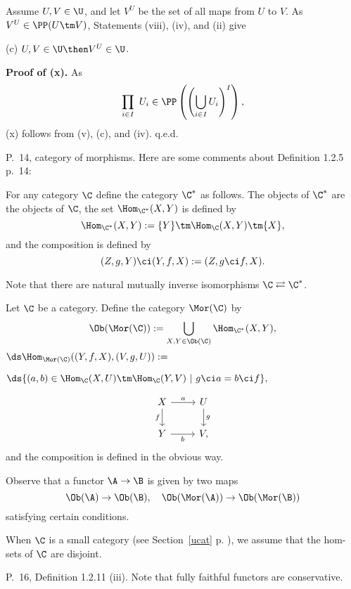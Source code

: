\documentclass[12pt]{article}
\theoremstyle{remark}
\theoremstyle{definition}
\begin{document}
Assume $U,V\in\U$, and let $V^U$ be the set of all maps from $U$ to $V$. As $V^U\in\PP(U\tm V)$, Statements (viii), (iv), and (ii) give

(c) $U,V\in\U\then V^U\in\U$.

\nn\textbf{Proof of (x).} As 
$$
\prod_{i\in I}\ U_i\in\PP\left(\left(\bigcup_{i\in I}U_i\right)^I\right),
$$
(x) follows from (v), (c), and (iv). q.e.d.



\begin{s}
P.~14, category of morphisms. Here are some comments about Definition 1.2.5 p.~14:

\begin{nota}
For any category $\C$ define the category $\C^*$\index{$\C^*$} as follows. The objects of $\C^*$ are the objects of $\C$, the set $\Hom_{\C^*}(X,Y)$ is defined by 
$$
\Hom_{\C^*}(X,Y):=\{Y\}\tm\Hom_{\C}(X,Y)\tm\{X\},
$$
and the composition is defined by 
$$
(Z,g,Y)\ci(Y,f,X):=(Z,g\ci f,X).
$$ 
\end{nota}

Note that there are natural mutually inverse isomorphisms $\C\rightleftarrows\C^*$. 

\begin{nota}
%
Let $\C$ be a category. Define the category $\Mor(\C)$ \index{$\Mor$} by 
$$
\Ob(\Mor(\C)):=\bigcup_{X,Y\in\Ob(\C)}\Hom_{\C^*}(X,Y),
$$
$\ds\Hom_{\Mor(\C)}((Y,f,X),(V,g,U)):=$\bigskip 

$\hfill\ds\{(a,b)\in\Hom_\C(X,U)\tm\Hom_\C(Y,V)\ | \ g\ci a=b\ci f\},$\bigskip

$$
\begin{tikzcd}
X\ar{d}[swap]{f}\ar{r}{a}&U\ar{d}{g}\\ 
Y\ar{r}[swap]{b}&V,
\end{tikzcd}
$$ 
and the composition is defined in the obvious way.
\end{nota}

Observe that a functor $\A\to\B$ is given by two maps 
$$
\Ob(\A)\to\Ob(\B),\quad\Ob(\Mor(\A))\to\Ob(\Mor(\B))
$$ 
satisfying certain conditions.

When $\C$ is a small category (see Section~\ref{ucat} p. ), we assume that the hom-sets of $\C$ are disjoint.
\end{s}

%

\begin{s}
P.~16, Definition 1.2.11 (iii). Note that fully faithful functors are conservative. 
\end{s}
\end{document}
